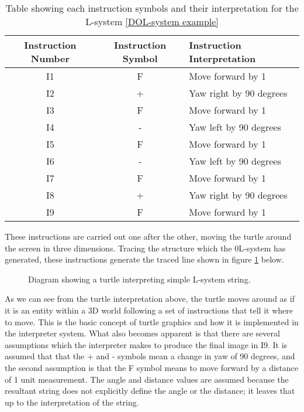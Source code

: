 \begin{table}[h!]
\centering
\begin{tabular}{ | c | c | l | }
\hline
	 	Instruction Number & Instruction Symbol & Instruction Interpretation \\  
\hline
\hline
	I1 						& F & Move forward by 1\\
\hline
	I2						& + & Yaw right by 90 degrees\\
\hline
	I3						& F & Move forward by 1\\
\hline
	I4						& - & Yaw left by 90 degrees \\
\hline
	I5						& F & Move forward by 1\\
\hline
	I6 						& - & Yaw left by 90 degrees \\
\hline
	I7 						& F & Move forward by 1\\
\hline
	I8 						& + & Yaw right by 90 degrees\\
\hline
	I9 						& F & Move forward by 1\\
\hline
\end{tabular}
\caption{Table showing each instruction symbols and their interpretation for the L-system \ref{DOL-system example}}
\label{Instruction Interpretation}
\end{table}
\FloatBarrier

\noindent
These instructions are carried out one after the other, moving the turtle around the screen in three dimensions. Tracing the structure which the 0L-system has generated, these instructions generate the traced line shown in figure \ref{basic turtle} below.

\begin{figure}[htbp]
	{\centering
		\setlength{\fboxrule}{1pt}
		\vspace{7px}
		\caption{Diagram showing a turtle interpreting simple L-system string.} \label{basic turtle}
	}
\end{figure}
\FloatBarrier

\noindent
As we can see from the turtle interpretation above, the turtle moves around as if it is an entity within a 3D world following a set of instructions that tell it where to move. This is the basic concept of turtle graphics and how it is implemented in the interpreter system. What also becomes apparent is that there are several assumptions which the interpreter makes to produce the final image in I9. It is assumed that that the + and - symbols mean a change in yaw of 90 degrees, and the second assumption is that the F symbol means to move forward by a distance of 1 unit measurement. The angle and distance values are assumed because the resultant string does not explicitly define the angle or the distance; it leaves that up to the interpretation of the string. 

